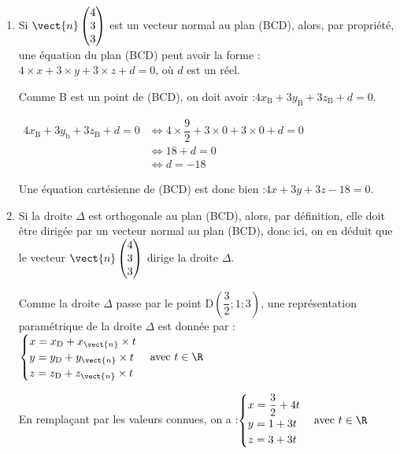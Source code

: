 \begin{enumerate}
\begin{enumerate}
		
		\item Si $\vect{n}\begin{pmatrix} 4\\3\\3 \end{pmatrix}$ est un vecteur normal au plan  (BCD), alors, par propriété, une équation du plan  (BCD) peut avoir la forme :\quad $4\times x + 3 \times y + 3 \times z + d = 0$, \quad où $d$ est un réel.
		
		Comme B est un point de (BCD), on doit avoir :\quad $4x_{\mathrm{B}} +3 y_{\mathrm{B}} + 3z_{\mathrm{B}} + d =0$.
		
		$\begin{aligned}
			4x_{\mathrm{B}} +3 y_{\mathrm{b}} + 3z_{\mathrm{B}} + d =0
			&\iff 4 \times \dfrac{9}{2} +3 \times 0 +3\times 0 +  d= 0\\
			&\iff 18 + d = 0\\
			&\iff d = -18
		\end{aligned}		$
		
		Une équation cartésienne de (BCD) est donc bien :\quad $4x+3y+3z - 18 = 0$.

		
		\item %
		Si la droite $\Delta$ est orthogonale au plan (BCD), alors, par définition, elle doit être dirigée par un vecteur normal au plan (BCD), donc ici, on en déduit que le vecteur $\vect{n} \begin{pmatrix} 4\\3\\3 \end{pmatrix}$ dirige la droite $\Delta$.
		
		Comme la droite $\Delta$ passe par le point D$\left(\dfrac{3}{2} ; 1 ; 3\right)$, une représentation paramétrique de la droite $\Delta$ est donnée par :\quad $\begin{cases}
			x=x_{\mathrm{D}} + x_{\vect{n}}\times t\\
			y=y_{\mathrm{D}} + y_{\vect{n}}\times t\\
			z=z_{\mathrm{D}} + z_{\vect{n}}\times t
		\end{cases}\text{avec } t \in \R$
		
		En remplaçant par les valeurs connues, on a :\quad $\begin{cases}
			x=\dfrac{3}{2} +4 t\\
			y=1 +3t\\
			z=3+3t
		\end{cases}\text{avec } t \in \R$
		

\end{enumerate}
\end{enumerate}
